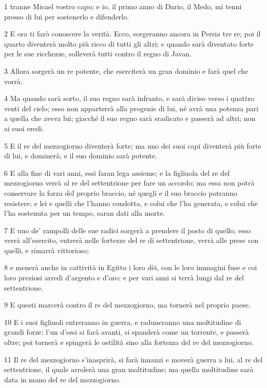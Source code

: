 \par 1 tranne Micael vostro capo; e io, il primo anno di Dario, il Medo, mi tenni presso di lui per sostenerlo e difenderlo.
\par 2 E ora ti farò conoscere la verità. Ecco, sorgeranno ancora in Persia tre re; poi il quarto diventerà molto più ricco di tutti gli altri; e quando sarà diventato forte per le sue ricchezze, solleverà tutti contro il regno di Javan.
\par 3 Allora sorgerà un re potente, che eserciterà un gran dominio e farà quel che vorrà.
\par 4 Ma quando sarà sorto, il suo regno sarà infranto, e sarà diviso verso i quattro venti del cielo; esso non apparterrà alla progenie di lui, né avrà una potenza pari a quella che aveva lui; giacché il suo regno sarà sradicato e passerà ad altri; non ai suoi eredi.
\par 5 E il re del mezzogiorno diventerà forte; ma uno dei suoi capi diventerà più forte di lui, e dominerà; e il suo dominio sarà potente.
\par 6 E alla fine di vari anni, essi faran lega assieme; e la figliuola del re del mezzogiorno verrà al re del settentrione per fare un accordo; ma essa non potrà conservare la forza del proprio braccio, né quegli e il suo braccio potranno resistere; e lei e quelli che l'hanno condotta, e colui che l'ha generata, e colui che l'ha sostenuta per un tempo, saran dati alla morte.
\par 7 E uno de' rampolli delle sue radici sorgerà a prendere il posto di quello; esso verrà all'esercito, entrerà nelle fortezze del re di settentrione, verrà alle prese con quelli, e rimarrà vittorioso;
\par 8 e menerà anche in cattività in Egitto i loro dèi, con le loro immagini fuse e coi loro preziosi arredi d'argento e d'oro; e per vari anni si terrà lungi dal re del settentrione.
\par 9 E questi marcerà contro il re del mezzogiorno, ma tornerà nel proprio paese.
\par 10 E i suoi figliuoli entreranno in guerra, e raduneranno una moltitudine di grandi forze; l'un d'essi si farà avanti, si spanderà come un torrente, e passerà oltre; poi tornerà e spingerà le ostilità sino alla fortezza del re del mezzogiorno.
\par 11 Il re del mezzogiorno s'inasprirà, si farà innanzi e moverà guerra a lui, al re del settentrione, il quale arrolerà una gran moltitudine; ma quella moltitudine sarà data in mano del re del mezzogiorno.
